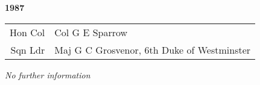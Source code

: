 \begin{center}
  \Huge
  \textbf{1987}
\end{center}

\begin{center}
  \small
  \begin{tabular}{rl}
    Hon Col & Col G E Sparrow \\
    Sqn Ldr & Maj G C Grosvenor, 6th Duke of Westminster \\
  \end{tabular}
\end{center}

\begin{center}
  \textit{No further information}
\end{center}

\vspace{50mm}

\pagebreak
